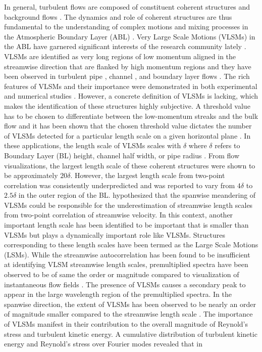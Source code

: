 In general, turbulent flows  are composed of constituent coherent structures and background flows \citep{hussain_1986_jfm}. The dynamics and role of coherent structures are thus fundamental to the understanding of complex motions and mixing processes in the Atmospheric Boundary Layer (ABL) \citep{lewalle_flowTurbCom_00,Fiedler_PAeroSci_1988}. Very Large Scale Motions (VLSMs) in the ABL have garnered significant interests of the research community lately \citep{Chinthaka_blm_2017,kerherv_roux_etfs_2017}. VLSMs  are identified as  very long regions of low momentum  aligned in the streamwise direction that are flanked by high momentum regions and they have been observed in turbulent pipe \citep{guala_adrian_jfm2006, kim_adrian_pof99, monty_jfm_07}, channel \citep{guala_adrian_jfm2006, monty_jfm_07, lee_sung_jfm_14}, and boundary layer flows \citep{fang2015blm,hutchins_marusic_jfm2007}. The rich features of VLSMs and their importance were demonstrated in both experimental \citep{kim_adrian_pof99,guala_adrian_jfm2006,hutchins_marusic_jfm2007,monty_jfm_07} and numerical studies \citep{fang2015blm,lee_sung_jfm_14,Lee_sung_jfm11}. However, a concrete definition of VLSMs is lacking, which makes the identification of these structures highly subjective. A threshold value has to be chosen to differentiate between the low-momentum streaks and the bulk flow and it has been shown that the chosen threshold value dictates the number of VLSMs detected for a particular length scale on a given horizontal plane \citep{baltzer_jfm_13}. In these applications, the length scale of VLSMs scales with $\delta$ where $\delta$ refers to Boundary Layer (BL)  height, channel half width, or pipe radius \citep{chung_jfm_10_large,monty_jfm_07}. From flow visualizations, the largest length scale of these coherent structures  were shown to be approximately $20\delta$. However,  the largest length scale from two-point correlation was consistently underpredicted and was reported to vary from $4\delta$ to $2.5\delta$ in the outer region of the BL. \citet{hutchins_marusic_jfm2007} hypothesized that the spanwise meandering of VLSMs could be responsible for the underestimation of streamwise length scales from two-point correlation of streamwise velocity. In this context, another important length scale has been identified to be important that is smaller than VLSMs but plays a dynamically important role like VLSMs. Structures corresponding to these length scales have been termed as the Large Scale Motions (LSMs). While the streamwise autocorrelation has been found to be insufficient at identifying VLSM streamwise length scales, premultiplied spectra have been observed to be of  same the order or magnitude compared to  visualization of instantaneous flow fields \citep{guala_adrian_jfm2006}.  The presence of VLSMs causes a secondary peak to appear in the large wavelength region of the premultiplied spectra. In the spanwise direction, the extent of VLSMs has been observed to be nearly an order of magnitude  smaller compared to the  streamwise length scale \citep{monty_jfm_07}.  The importance of VLSMs manifest in their  contribution to the overall magnitude of Reynold's stress and turbulent kinetic  energy.  A cumulative  distribution  of turbulent kinetic energy  and Reynold's stress  over Fourier modes revealed that in 
